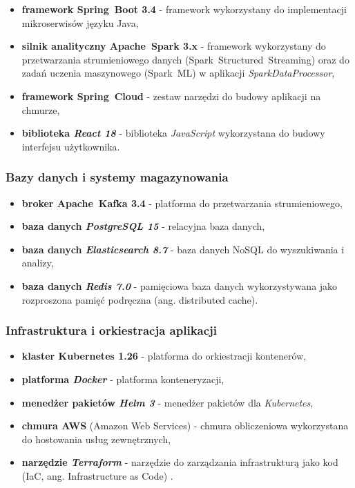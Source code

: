 \begin{itemize}
    \item \textbf{framework \mbox{Spring Boot} 3.4} - framework wykorzystany do implementacji mikroserwisów języku Java,
    \item \textbf{silnik analityczny \mbox{Apache Spark} 3.x} \cite{spark_streaming} - framework wykorzystany do przetwarzania strumieniowego danych (\mbox{Spark Structured Streaming}) \cite{chambers2018spark} oraz do zadań uczenia maszynowego (\mbox{Spark ML}) w aplikacji \textit{SparkDataProcessor},
    \item \textbf{framework \mbox{Spring Cloud}} - zestaw narzędzi do budowy aplikacji na chmurze,
    \item \textbf{biblioteka \textit{React 18}} - biblioteka \textit{JavaScript} wykorzystana do budowy interfejsu użytkownika.
\end{itemize}

\subsubsection{Bazy danych i systemy magazynowania}
\label{subsubsec:bazy_danych}

\begin{itemize}
    \item \textbf{broker \mbox{Apache Kafka} 3.4} \cite{kafka} - platforma do przetwarzania strumieniowego,
    \item \textbf{baza danych \textit{PostgreSQL 15}} - relacyjna baza danych,
    \item \textbf{baza danych \textit{Elasticsearch 8.7}} - baza danych \mbox{NoSQL} \cite{nosql_definition} do wyszukiwania i analizy,
    \item \textbf{baza danych \textit{Redis 7.0}} - pamięciowa baza danych wykorzystywana jako rozproszona pamięć podręczna (ang. distributed cache).
\end{itemize}

\subsubsection{Infrastruktura i orkiestracja aplikacji}
\label{subsubsec:infrastruktura}

\begin{itemize}
    \item \textbf{klaster \textbf{Kubernetes} 1.26} \cite{kubernetes} - platforma do orkiestracji kontenerów,
    \item \textbf{platforma \textit{Docker}} - platforma konteneryzacji,
    \item \textbf{menedżer pakietów \textit{Helm 3}} - menedżer pakietów dla \textit{Kubernetes},
    \item \textbf{chmura \textbf{AWS}} (Amazon Web Services) \cite{aws_definition} - chmura obliczeniowa wykorzystana do hostowania usług zewnętrznych,
    \item \textbf{narzędzie \textit{Terraform}} - narzędzie do zarządzania infrastrukturą jako kod (IaC, ang. Infrastructure as Code) \cite{terraform_docs}.
\end{itemize}


